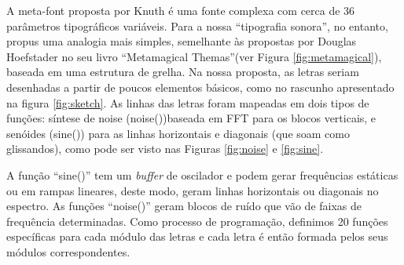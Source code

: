 A meta-font proposta por Knuth é uma fonte complexa com cerca de 36 parâmetros tipográficos variáveis. Para a nossa ``tipografia sonora'', no entanto, propus uma analogia mais simples, semelhante às propostas por Douglas Hoefstader no seu livro ``Metamagical Themas''\cite{Metamagical1986}(ver Figura \ref{fig:metamagical}), baseada em uma estrutura de grelha. Na nossa proposta, as letras seriam desenhadas a partir de poucos elementos básicos, como no rascunho apresentado na figura \ref{fig:sketch}. As linhas das letras foram mapeadas em dois tipos de funções: síntese de noise (noise())baseada em FFT para os blocos verticais, e senóides (sine()) para as linhas horizontais e diagonais (que soam como glissandos), como pode ser visto nas Figuras \ref{fig:noise} e \ref{fig:sine}. 




A função ``sine()'' tem um \emph{buffer} de oscilador e podem gerar frequências estáticas ou em rampas lineares, deste modo, geram linhas horizontais ou diagonais no espectro. As funções ``noise()'' geram blocos de ruído que vão de faixas de frequência determinadas. Como processo de programação, definimos 20 funções específicas para cada módulo das letras e cada letra é então formada pelos seus módulos correspondentes. 






